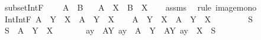 \begin{isabellebody}
%
\endisatagproof
{\isafoldproof}%
%
\isadelimproof
\isanewline
%
\endisadelimproof
\isanewline
{}\isamarkupfalse%
\ subset{\isacharunderscore}{\kern0pt}IntF{\isacharcolon}{\kern0pt}\ \isanewline
\ \ \ {\isachardoublequoteopen}A\ {\isasymsubseteq}\ B{\isachardoublequoteclose}\isanewline
\ \ \ {\isachardoublequoteopen}A\ {\isasyminter}{\isacharasterisk}{\kern0pt}\ X\ {\isasymsubseteq}\ B\ {\isasyminter}{\isacharasterisk}{\kern0pt}\ X{\isachardoublequoteclose}\isanewline
%
\isadelimproof
\ \ %
\endisadelimproof
%
\isatagproof
{}\isamarkupfalse%
\ assms\ \isamarkupfalse%
\ {\isacharparenleft}{\kern0pt}rule\ image{\isacharunderscore}{\kern0pt}mono{\isacharparenright}{\kern0pt}%
\endisatagproof
{\isafoldproof}%
%
\isadelimproof
\isanewline
%
\endisadelimproof
\isanewline
{}\isamarkupfalse%
\ Int{\isacharunderscore}{\kern0pt}IntF{\isacharcolon}{\kern0pt}\ {\isachardoublequoteopen}{\isacharparenleft}{\kern0pt}A\ {\isasyminter}{\isacharasterisk}{\kern0pt}\ Y{\isacharparenright}{\kern0pt}\ {\isasyminter}{\isacharasterisk}{\kern0pt}\ X\ {\isacharequal}{\kern0pt}\ A\ {\isasyminter}{\isacharasterisk}{\kern0pt}\ {\isacharparenleft}{\kern0pt}Y\ {\isasyminter}\ X{\isacharparenright}{\kern0pt}{\isachardoublequoteclose}\isanewline
%
\isadelimproof
%
\endisadelimproof
%
\isatagproof
{}\isamarkupfalse%
\isanewline
\ \ \isamarkupfalse%
\ {\isachardoublequoteopen}A\ {\isasyminter}{\isacharasterisk}{\kern0pt}\ Y\ {\isasyminter}{\isacharasterisk}{\kern0pt}\ X\ {\isasymsubseteq}\ A\ {\isasyminter}{\isacharasterisk}{\kern0pt}\ {\isacharparenleft}{\kern0pt}Y\ {\isasyminter}\ X{\isacharparenright}{\kern0pt}{\isachardoublequoteclose}\isanewline
\ \ \isamarkupfalse%
\isanewline
\ \ \ \ \isamarkupfalse%
\ S\isanewline
\ \ \ \ \isamarkupfalse%
\ {\isachardoublequoteopen}S\ {\isasymin}\ A\ {\isasyminter}{\isacharasterisk}{\kern0pt}\ Y\ {\isasyminter}{\isacharasterisk}{\kern0pt}\ X{\isachardoublequoteclose}\isanewline
\ \ \ \ \isamarkupfalse%
\ \isamarkupfalse%
\ a{\isacharunderscore}{\kern0pt}y\ \ A{\isacharunderscore}{\kern0pt}Y{}{\isacharcolon}{\kern0pt}\ {\isachardoublequoteopen}a{\isacharunderscore}{\kern0pt}y\ {\isasymin}\ A\ {\isasyminter}{\isacharasterisk}{\kern0pt}\ Y{\isachardoublequoteclose}\ \ A{\isacharunderscore}{\kern0pt}Y{}{\isacharcolon}{\kern0pt}\ {\isachardoublequoteopen}a{\isacharunderscore}{\kern0pt}y\ {\isasyminter}\ X\ {\isacharequal}{\kern0pt}\ S{\isachardoublequoteclose}\ \isamarkupfalse%

\end{isabellebody}
